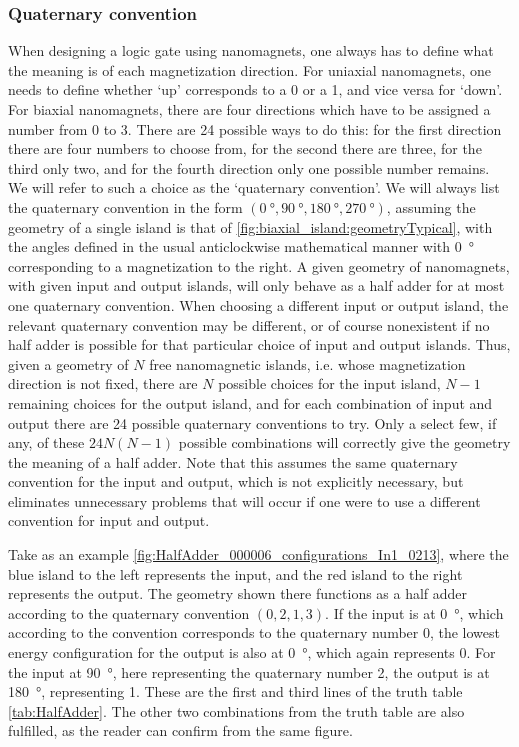 \documentclass[11pt,a4paper,english]{article}
\begin{document}
\subsubsection{Quaternary convention}
When designing a logic gate using nanomagnets, one always has to define what the meaning is of each magnetization direction. For uniaxial nanomagnets, one needs to define whether `up' corresponds to a 0 or a 1, and vice versa for `down'. For biaxial nanomagnets, there are four directions which have to be assigned a number from 0 to 3. There are 24 possible ways to do this: for the first direction there are four numbers to choose from, for the second there are three, for the third only two, and for the fourth direction only one possible number remains. We will refer to such a choice as the `quaternary convention'. We will always list the quaternary convention in the form $(\SI{0}{\degree}, \SI{90}{\degree}, \SI{180}{\degree}, \SI{270}{\degree})$, assuming the geometry of a single island is that of \cref{fig:biaxial_island:geometryTypical}, with the angles defined in the usual anticlockwise mathematical manner with \SI{0}{\degree} corresponding to a magnetization to the right. A given geometry of nanomagnets, with given input and output islands, will only behave as a half adder for at most one quaternary convention. When choosing a different input or output island, the relevant quaternary convention may be different, or of course nonexistent if no half adder is possible for that particular choice of input and output islands. Thus, given a geometry of $N$ free nanomagnetic islands, i.e. whose magnetization direction is not fixed, there are $N$ possible choices for the input island, $N-1$ remaining choices for the output island, and for each combination of input and output there are 24 possible quaternary conventions to try. Only a select few, if any, of these $24N(N-1)$ possible combinations will correctly give the geometry the meaning of a half adder. Note that this assumes the same quaternary convention for the input and output, which is not explicitly necessary, but eliminates unnecessary problems that will occur if one were to use a different convention for input and output. \par
Take as an example \cref{fig:HalfAdder_000006_configurations_In1_0213}, where the blue island to the left represents the input, and the red island to the right represents the output. The geometry shown there functions as a half adder according to the quaternary convention $(0, 2, 1, 3)$. If the input is at \SI{0}{\degree}, which according to the convention corresponds to the quaternary number 0, the lowest energy configuration for the output is also at \SI{0}{\degree}, which again represents 0. For the input at \SI{90}{\degree}, here representing the quaternary number 2, the output is at \SI{180}{\degree}, representing 1. These are the first and third lines of the truth table~ \ref{tab:HalfAdder}. The other two combinations from the truth table are also fulfilled, as the reader can confirm from the same figure. \par
\end{document}
